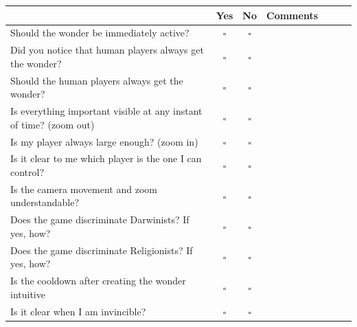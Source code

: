 \documentclass[11pt,a4paper,titlepage,table]{article}
\begin{document}
\begin{table}[H]
\begin{tabularx}{1.1\textwidth}{|X|S|S|X|S|S|X|}
	\hline
  		& Yes & No & Comments\\
  	\hline
  		Should the wonder be immediately active? & $\square$ & $\square$ &\\
  	\hline
		Did you notice that human players always get the wonder? & $\square$ & $\square$ &\\
	\hline
		Should the human players always get the wonder? & $\square$ & $\square$ &\\
	\hline
		Is everything important visible at any instant of time? (zoom out) & $\square$ & $\square$ &\\	
	\hline
		Is my player always large enough? (zoom in) & $\square$ & $\square$ &\\
	\hline
		Is it clear to me which player is the one I can control?& $\square$ & $\square$ &\\
	\hline
		Is the camera movement and zoom understandable?& $\square$ & $\square$ &\\
	\hline
		Does the game discriminate Darwinists? If yes, how?& $\square$ & $\square$ &\\
	\hline
		Does the game discriminate Religionists? If yes, how?& $\square$ & $\square$ &\\
	\hline
		Is the cooldown after creating the wonder intuitive& $\square$ & $\square$ &\\
	\hline
		Is it clear when I am invincible?& $\square$ & $\square$ &\\
	\hline
\end{tabularx}
\end{table}
\end{document}
